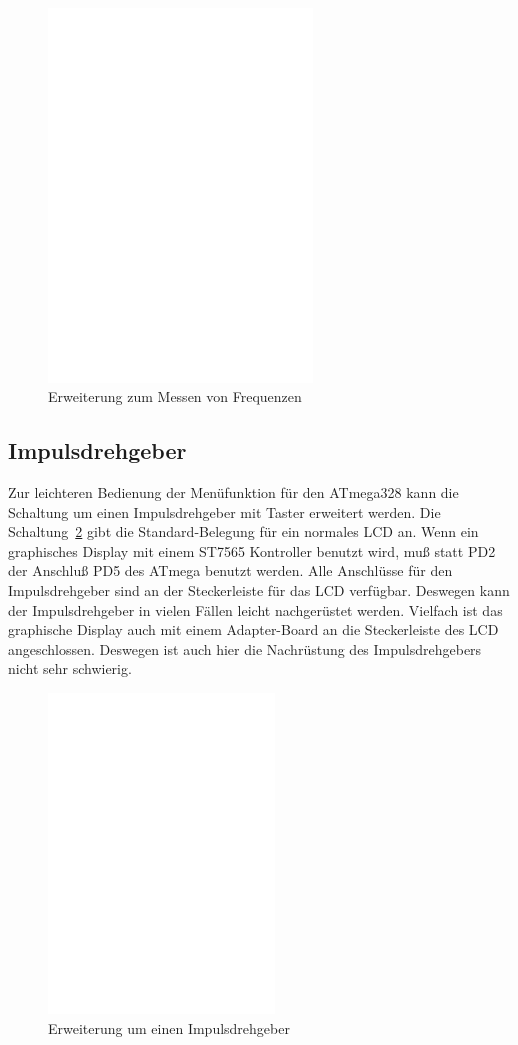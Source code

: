\begin{figure}[H]
\centering
\includegraphics[width=7cm]{../FIG/Frequency_addon.eps}
\caption{Erweiterung zum Messen von Frequenzen}
\label{fig:FreqMes}
\end{figure}

\subsection{Impulsdrehgeber}

Zur leichteren Bedienung der Menüfunktion für den ATmega328 kann die Schaltung um einen
Impulsdrehgeber mit Taster erweitert werden. Die Schaltung~\ref{fig:RotExt} gibt die Standard-Belegung
für ein normales LCD an. Wenn ein graphisches Display mit einem ST7565 Kontroller benutzt wird,
muß statt PD2 der Anschluß PD5 des ATmega benutzt werden. Alle Anschlüsse für den Impulsdrehgeber
sind an der Steckerleiste für das LCD verfügbar. Deswegen kann der Impulsdrehgeber in vielen Fällen 
leicht nachgerüstet werden. Vielfach ist das graphische Display auch mit einem Adapter-Board an die
Steckerleiste des LCD angeschlossen. Deswegen ist auch hier die Nachrüstung des Impulsdrehgebers nicht
sehr schwierig.

\begin{figure}[H]
\centering
\includegraphics[width=6cm]{../FIG/rotary_extension.eps}
\caption{Erweiterung um einen Impulsdrehgeber}
\label{fig:RotExt}
\end{figure}

